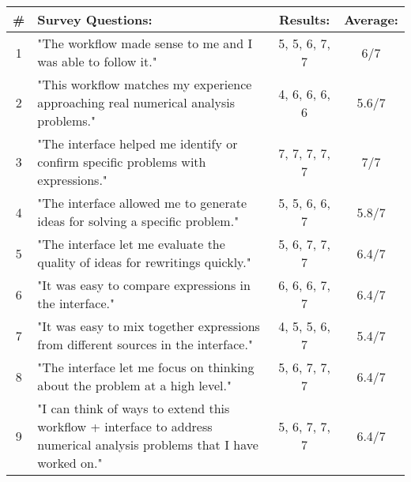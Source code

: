{\renewcommand{\arraystretch}{1.25}
\begin{tabular}{||c|p{12cm}|c|c||}
    \hline
    \# & Survey Questions: & Results: & Average:\\
    \hline
    1 & "The workflow made sense to me and I was able to follow it." 
    & 5,  5,  6,  7,  7 & 6/7\\
    \hline
    2 & "This workflow matches my experience approaching real numerical analysis
    problems." & 4,  6,  6,  6,  6 & 5.6/7\\
    \hline
    3 & "The interface helped me identify or confirm specific problems with
    expressions." & 7,  7,  7,  7,  7 & 7/7\\
    \hline
    4 & "The interface allowed me to generate ideas for solving a specific problem." & 5,  5,  6,  6,  7 & 5.8/7\\
    \hline
    5 & "The interface let me evaluate the quality of ideas for rewritings quickly."
    & 5,  6,  7,  7,  7 & 6.4/7\\
    \hline
    6 & "It was easy to compare expressions in the interface." & 6,  6,  6,  7,  7 & 6.4/7\\
    \hline
    7 & "It was easy to mix together expressions from different sources in the interface." & 4,  5,  5,  6,  7 & 5.4/7\\
    \hline
    8 & "The interface let me focus on thinking about the problem at a high level." & 5,  6,  7,  7,  7 & 6.4/7 \\
    \hline
    9 & "I can think of ways to extend this workflow + interface to address numerical analysis problems that I have worked on." & 5,  6,  7,  7,  7 & 6.4/7 \\
    \hline
\end{tabular}}
